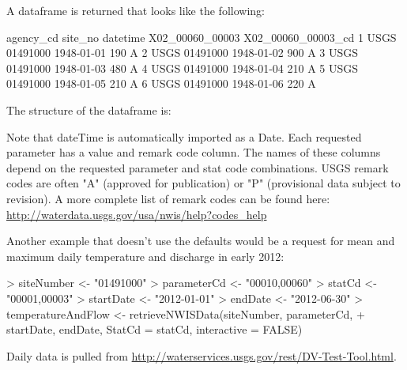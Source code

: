 \documentclass[a4paper,11pt]{article}
\begin{document}
A dataframe is returned that looks like the following:
\begin{Schunk}
\begin{Soutput}
  agency_cd  site_no   datetime X02_00060_00003 X02_00060_00003_cd
1      USGS 01491000 1948-01-01             190                  A
2      USGS 01491000 1948-01-02             900                  A
3      USGS 01491000 1948-01-03             480                  A
4      USGS 01491000 1948-01-04             210                  A
5      USGS 01491000 1948-01-05             210                  A
6      USGS 01491000 1948-01-06             220                  A
\end{Soutput}
\end{Schunk}
The structure of the dataframe is:
\begin{Schunk}
\end{Schunk}
Note that dateTime is automatically imported as a Date. Each requested parameter has a value and remark code column.  The names of these columns depend on the requested parameter and stat code combinations. USGS remark codes are often "A" (approved for publication) or "P" (provisional data subject to revision). A more complete list of remark codes can be found here:
\url{http://waterdata.usgs.gov/usa/nwis/help?codes_help}

Another example that doesn't use the defaults would be a request for mean and maximum daily temperature and discharge in early 2012:
\begin{Schunk}
\begin{Sinput}
> siteNumber <- "01491000"
> parameterCd <- "00010,00060"
> statCd <- "00001,00003"
> startDate <- "2012-01-01"
> endDate <- "2012-06-30"
> temperatureAndFlow <- retrieveNWISData(siteNumber, parameterCd, 
+     startDate, endDate, StatCd = statCd, interactive = FALSE)
\end{Sinput}
\end{Schunk}

Daily data is pulled from \url{http://waterservices.usgs.gov/rest/DV-Test-Tool.html}. 
\end{document}
